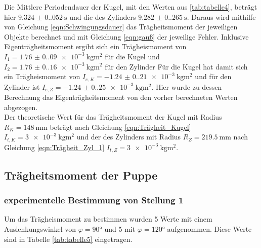   Die Mittlere Periodendauer der Kugel, mit den Werten aus \ref{tab:tabelle4}, beträgt hier $\qty{9.324(0.052)}{\second}$ und die des Zylinders $\qty{9.282(0.265)}{\second}$.
  Daraus wird mithilfe von Gleichung \ref{eqn:Schwingungsdauer} das Trägheitsmoment der jeweiligen Objekte berechnet und mit Gleichung \ref{eqn:gauß} der jeweilige Fehler.
  Inklusive Eigenträgheitsmoment ergibt sich ein Trägheismoment von $I_1=\qty{1.76(0.09)e-3}{\kilo\gram\meter\squared}$ für die Kugel und
  $I_2=\qty{1.76(0.16)e-3}{\kilo\gram\meter\squared}$ für den Zylinder
  Für die Kugel hat damit sich ein Trägheismoment von $I_{e,K}=\qty{-1.24(0.21)e-3}{\kilo\gram\meter\squared}$ und für den
  Zylinder ist $I_{e,Z}=\qty{-1.24(0.25)e-3}{\kilo\gram\meter\squared}$. Hier wurde zu dessen Berechnung das Eigenträgheitsmoment
  von den vorher berechneten Werten abgezogen.\\
  Der theoretische Wert für das Trägheitsmoment der Kugel mit Radius $R_K=\qty{148}{\milli\meter}$ beträgt nach Gleichung \ref{eqn:Trägheit_Kugel} $I_{t,K}=\qty{3e-3}{\kilo\gram\meter\squared}$
  und der des Zylinders mit Radius $R_Z=\qty{219.5}{\milli\meter}$ nach Gleichung \ref{eqn:Trägheit_Zyl_1} $I_{t,Z}=\qty{3e-3}{\kilo\gram\meter\squared}$.
  
  \subsection{Trägheitsmoment der Puppe}
    \subsubsection{experimentelle Bestimmung von Stellung 1}
    Um das Trägheismoment zu bestimmen wurden 5 Werte mit einem Auslenkungswinkel von $\varphi=90°$ und 5 mit $\varphi=120°$ aufgenommen.
    Diese Werte sind in Tabelle \ref{tab:tabelle5} eingetragen.


